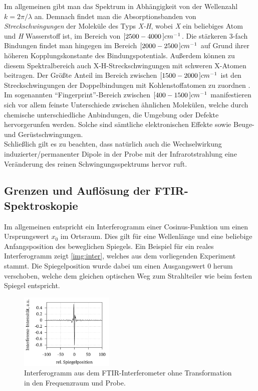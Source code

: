 \documentclass[numbers=noenddot,a4paper,10pt,twocolumn]{article}
\newcommand{\ix}[1]{_\text{#1}}
\newcommand{\tilt}[1]{\textit{#1}}
\begin{document}
		Im allgemeinen gibt man das Spektrum in Abh\"angigkeit von der Wellenzahl $k=2\pi/\lambda$ an. Demnach findet man die Absorptionsbanden von \tilt{Streckschwingungen} der Molek\"ule des Typs \tilt{X-H}, wobei \tilt{X} ein beliebiges Atom und \tilt{H} Wasserstoff ist, im Bereich von $\unit[[2500-4000]]{cm^{-1}}$. Die st\"arkeren 3-fach Bindungen findet man hingegen im Bereich $\unit[[2000-2500]]{cm^{-1}}$ auf Grund ihrer h\"oheren Kopplungskonstante des Bindungspotentials. Au{\ss}erdem k\"onnen zu diesem Spektralbereich auch X-H-Streckschwingungen mit schweren X-Atomen beitragen. Der Gr\"o{\ss}te Anteil im Bereich zwischen $\unit[[1500-2000]]{cm^{-1}}$ ist den Streckschwingungen der Doppelbindungen mit Kohlenstoffatomen zu zuordnen \cite{FTIRAns}.\\
		Im sogenannten ``Fingerprint''-Bereich zwischen $\unit[[400-1500]]{cm^{-1}}$ manifestieren sich vor allem feinste Unterschiede zwischen \"ahnlichen Molek\"ulen, welche durch chemische unterschiedliche Anbindungen, die Umgebung oder Defekte hervorgerunfen werden. Solche sind s\"amtliche elektronischen Effekte sowie Beuge- und Ger\"ustschwingungen.\\
		Schlie{\ss}lich gilt es zu beachten, dass nat\"urlich auch die Wechselwirkung induzierter/permanenter Dipole in der Probe mit der Infrarotstrahlung eine Ver\"anderung des reinen Schwingungsspektrums hervor ruft.
		
	\subsection{Grenzen und Aufl\"osung der FTIR-Spektroskopie}
	
		Im allgemeinen entspricht ein Interferogramm einer Cosinus-Funktion um einen Ursprungswert $x\ix{0}$ im Ortsraum. Dies gilt f\"ur eine Wellenl\"ange und eine beliebige Anfangsposition des beweglichen Spiegels. Ein Beispiel f\"ur ein reales Interferogramm zeigt \autoref{img:inter}, welches aus dem vorliegenden Experiment stammt. Die Spiegelposition wurde dabei um einen Ausgangswert 0 herum verschoben, welche dem gleichen optischen Weg zum Strahlteiler wie beim festen Spiegel entspricht.
		
		\begin{figure}[h]
			\centering
			\includegraphics[width=0.4\textwidth]{Gruppe2A/inter.pdf}
			\caption{Interferogramm aus dem FTIR-Interferometer ohne Transformation in den Frequenzraum und Probe.}
			\label{img:inter}
		\end{figure}
	
\end{document}
